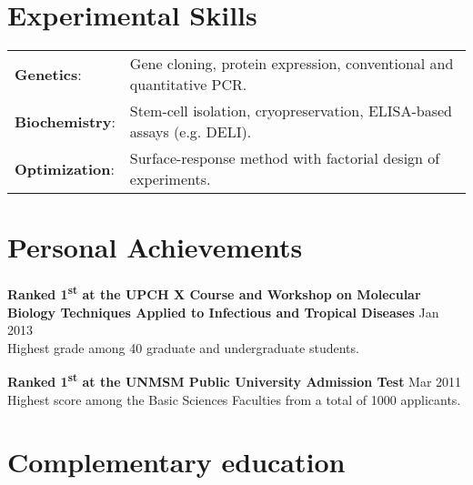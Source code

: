 \documentclass[margin,line]{res}
\begin{document}
\begin{resume}
\section{\sc Experimental Skills}
\begin{tabular}{ l l }
	{\bf Genetics}: & Gene cloning, protein expression, conventional and quantitative PCR.\\
	{\bf Biochemistry}: & Stem-cell isolation, cryopreservation, ELISA-based assays (e.g. DELI).\\ 
	{\bf Optimization}: & Surface-response method with factorial design of experiments.\\
\end{tabular}

\newpage

\section{\sc Personal Achievements}

{\bf Ranked 1\textsuperscript{st} at the UPCH X Course and Workshop on Molecular\\Biology Techniques Applied to Infectious and Tropical Diseases} \hfill Jan 2013\\
Highest grade among 40 graduate and undergraduate students. %

{\bf Ranked 1\textsuperscript{st} at the UNMSM Public University Admission Test} \hfill Mar 2011\\
Highest score among the Basic Sciences Faculties from a total of 1000 applicants.\\%

\section{\sc Complementary education}


\end{resume}
\end{document}
